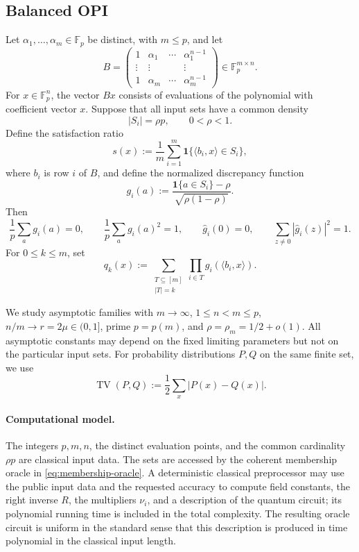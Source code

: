 \documentclass[11pt,letterpaper]{article}
\theoremstyle{definition}
\newcommand{\F}{\mathbb{F}}
\newcommand{\TV}{\operatorname{TV}}
\newcommand{\abs}[1]{\left\lvert #1\right\rvert}
\newcommand{\one}{\mathbf{1}}
\begin{document}
\subsection{Balanced OPI}

Let $\alpha_1,\ldots,\alpha_m\in\F_p$ be distinct, with $m\le p$, and let
\begin{equation}
   B=\begin{pmatrix}
      1&\alpha_1&\cdots&\alpha_1^{n-1}\\
      \vdots&\vdots&&\vdots\\
      1&\alpha_m&\cdots&\alpha_m^{n-1}
   \end{pmatrix}\in\F_p^{m\times n}.
   \label{eq:vandermonde}
\end{equation}
For $x\in\F_p^n$, the vector $Bx$ consists of evaluations of the polynomial with coefficient vector $x$.  Suppose that all input sets have a common density
\[
   \abs{S_i}=\rho p,
   \qquad 0<\rho<1.
\]
Define the satisfaction ratio
\begin{equation}
   s(x):=\frac1m\sum_{i=1}^m\one\{\langle b_i,x\rangle\in S_i\},
   \label{eq:score}
\end{equation}
where $b_i$ is row $i$ of $B$, and define the normalized discrepancy function
\begin{equation}
   g_i(a):=\frac{\one\{a\in S_i\}-\rho}{\sqrt{\rho(1-\rho)}}.
   \label{eq:gi}
\end{equation}
Then
\begin{equation}
   \frac1p\sum_a g_i(a)=0,
   \qquad
   \frac1p\sum_a g_i(a)^2=1,
   \qquad
   \widehat g_i(0)=0,
   \qquad
   \sum_{z\ne0}\abs{\widehat g_i(z)}^2=1.
   \label{eq:gi-properties}
\end{equation}
For $0\le k\le m$, set
\begin{equation}
   q_k(x):=\sum_{\substack{T\subseteq[m]\\\abs{T}=k}}
              \prod_{i\in T}g_i(\langle b_i,x\rangle).
   \label{eq:qk}
\end{equation}

We study asymptotic families with $m\to\infty$, $1\le n<m\le p$, $n/m\to r=2\mu\in(0,1]$, prime $p=p(m)$, and $\rho=\rho_m=1/2+o(1)$.  All asymptotic constants may depend on the fixed limiting parameters but not on the particular input sets.  For probability distributions $P,Q$ on the same finite set, we use
\[
   \TV(P,Q):=\frac12\sum_x\abs{P(x)-Q(x)}.
\]

\paragraph{Computational model.}
The integers $p,m,n$, the distinct evaluation points, and the common cardinality $\rho p$ are classical input data.  The sets are accessed by the coherent membership oracle in \cref{eq:membership-oracle}.  A deterministic classical preprocessor may use the public input data and the requested accuracy to compute field constants, the right inverse $R$, the multipliers $\nu_i$, and a description of the quantum circuit; its polynomial running time is included in the total complexity.  The resulting oracle circuit is uniform in the standard sense that this description is produced in time polynomial in the classical input length.
\end{document}
